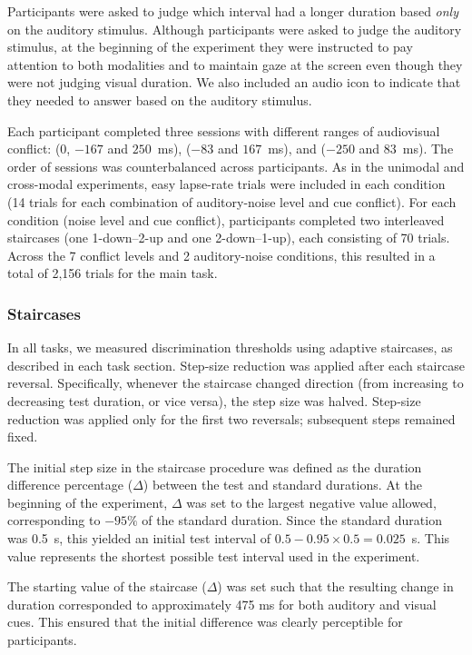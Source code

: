 \documentclass{jov}
\begin{document}
Participants were asked to judge which interval had a longer duration based {\em only} on the auditory stimulus. Although participants were asked to judge the auditory stimulus, at the beginning of the experiment they were instructed to pay attention to both modalities and to maintain gaze at the screen even though they were not judging visual duration. We also included an audio icon to indicate that they needed to answer based on the auditory stimulus.

Each participant completed three sessions with different ranges of audiovisual conflict: (0, $-167$ and $250$~ms), ($-83$ and $167$~ms), and ($-250$ and $83$~ms). The order of sessions was counterbalanced across participants. As in the unimodal and cross-modal experiments, easy lapse-rate trials were included in each condition (14 trials for each combination of auditory-noise level and cue conflict). For each condition (noise level and cue conflict), participants completed two interleaved staircases (one 1-down–2-up and one 2-down–1-up), each consisting of 70 trials. Across the 7 conflict levels and 2 auditory-noise conditions, this resulted in a total of 2,156 trials for the main task.

\subsubsection{Staircases}

In all tasks, we measured discrimination thresholds using adaptive staircases, as described in each task section. Step-size reduction was applied after each staircase reversal. Specifically, whenever the staircase changed direction (from increasing to decreasing test duration, or vice versa), the step size was halved. Step-size reduction was applied only for the first two reversals; subsequent steps remained fixed.

The initial step size in the staircase procedure was defined as the duration difference percentage ($\Delta$) between the test and standard durations. At the beginning of the experiment, $\Delta$ was set to the largest negative value allowed, corresponding to $-95\%$ of the standard duration. Since the standard duration was 0.5~s, this yielded an initial test interval of $0.5 - 0.95 \times 0.5 = 0.025$~s. This value represents the shortest possible test interval used in the experiment.

The starting value of the staircase ($\Delta$) was set such that the resulting change in duration corresponded to approximately 475 ms for both auditory and visual cues. This ensured that the initial difference was clearly perceptible for participants.
\end{document}
